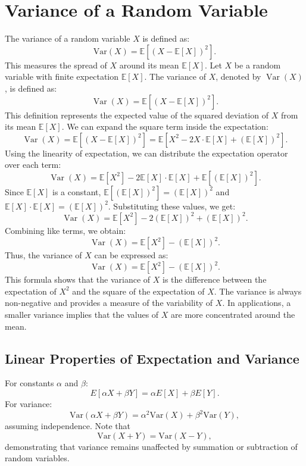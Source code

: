     \section{Variance of a Random Variable}
    
    The variance of a random variable \( X \) is defined as:
    \[
    \text{Var}(X) = \mathbb{E}[(X - \mathbb{E}[X])^2].
    \]
    This measures the spread of \( X \) around its mean \( \mathbb{E}[X] \). \newline
    Let \( X \) be a random variable with finite expectation \( \mathbb{E}[X] \). The variance of \( X \), denoted by \( \operatorname{Var}(X) \), is defined as:
    \[
    \operatorname{Var}(X) = \mathbb{E}[(X - \mathbb{E}[X])^2].
    \]
    This definition represents the expected value of the squared deviation of \( X \) from its mean \( \mathbb{E}[X] \). \newline
    We can expand the square term inside the expectation:
    \[
    \operatorname{Var}(X) = \mathbb{E}[(X - \mathbb{E}[X])^2] = \mathbb{E}[X^2 - 2X \cdot \mathbb{E}[X] + (\mathbb{E}[X])^2].
    \]
    Using the linearity of expectation, we can distribute the expectation operator over each term:
    \[
    \operatorname{Var}(X) = \mathbb{E}[X^2] - 2 \mathbb{E}[X] \cdot \mathbb{E}[X] + \mathbb{E}[(\mathbb{E}[X])^2].
    \]
    Since \( \mathbb{E}[X] \) is a constant, \( \mathbb{E}[(\mathbb{E}[X])^2] = (\mathbb{E}[X])^2 \) and \( \mathbb{E}[X] \cdot \mathbb{E}[X] = (\mathbb{E}[X])^2 \). Substituting these values, we get:
    \[
    \operatorname{Var}(X) = \mathbb{E}[X^2] - 2(\mathbb{E}[X])^2 + (\mathbb{E}[X])^2.
    \]
    Combining like terms, we obtain:
    \[
    \operatorname{Var}(X) = \mathbb{E}[X^2] - (\mathbb{E}[X])^2.
    \]
    Thus, the variance of \( X \) can be expressed as:
    \[
    \operatorname{Var}(X) = \mathbb{E}[X^2] - (\mathbb{E}[X])^2.
    \]
    This formula shows that the variance of \( X \) is the difference between the expectation of \( X^2 \) and the square of the expectation of \( X \). \newline
    The variance is always non-negative and provides a measure of the variability of \( X \). In applications, a smaller variance implies that the values of \( X \) are more concentrated around the mean.

    \subsection{Linear Properties of Expectation and Variance}
For constants \( \alpha \) and \( \beta \):
\[
E[\alpha X + \beta Y] = \alpha E[X] + \beta E[Y].
\]
For variance:
\[
\text{Var}(\alpha X + \beta Y) = \alpha^2 \text{Var}(X) + \beta^2 \text{Var}(Y),
\]
assuming independence. Note that
\[
\text{Var}(X + Y) = \text{Var}(X - Y),
\]
demonstrating that variance remains unaffected by summation or subtraction of random variables.
    
